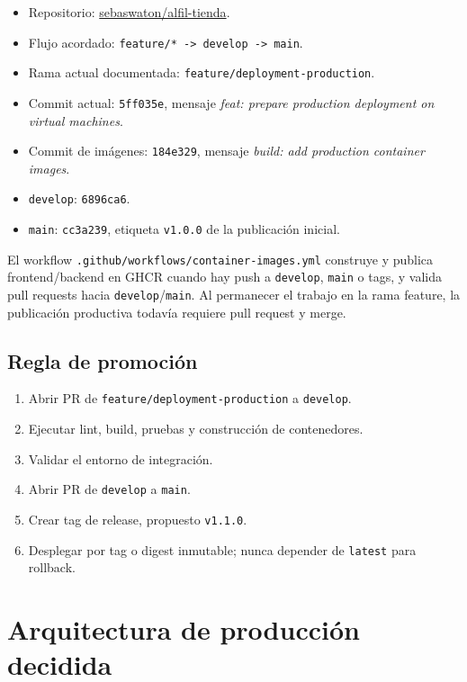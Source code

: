 \documentclass[11pt,a4paper]{article}
\newcommand{\code}[1]{\nolinkurl{#1}}
\begin{document}
\begin{itemize}
  \item Repositorio: \href{https://github.com/sebaswaton/alfil-tienda}{sebaswaton/alfil-tienda}.
  \item Flujo acordado: \code{feature/* -> develop -> main}.
  \item Rama actual documentada: \code{feature/deployment-production}.
  \item Commit actual: \code{5ff035e}, mensaje \emph{feat: prepare production deployment on virtual machines}.
  \item Commit de imágenes: \code{184e329}, mensaje \emph{build: add production container images}.
  \item \code{develop}: \code{6896ca6}.
  \item \code{main}: \code{cc3a239}, etiqueta \code{v1.0.0} de la publicación inicial.
\end{itemize}

El workflow \code{.github/workflows/container-images.yml} construye y publica frontend/backend en GHCR cuando hay push a \code{develop}, \code{main} o tags, y valida pull requests hacia \code{develop}/\code{main}. Al permanecer el trabajo en la rama feature, la publicación productiva todavía requiere pull request y merge.

\subsection{Regla de promoción}

\begin{enumerate}
  \item Abrir PR de \code{feature/deployment-production} a \code{develop}.
  \item Ejecutar lint, build, pruebas y construcción de contenedores.
  \item Validar el entorno de integración.
  \item Abrir PR de \code{develop} a \code{main}.
  \item Crear tag de release, propuesto \code{v1.1.0}.
  \item Desplegar por tag o digest inmutable; nunca depender de \code{latest} para rollback.
\end{enumerate}

\section{Arquitectura de producción decidida}
\end{document}
